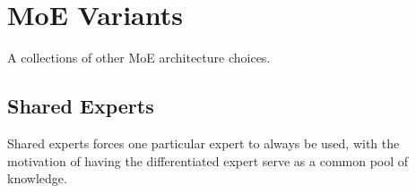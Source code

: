 \section{MoE Variants}

A collections of other MoE architecture choices.

\subsection{Shared Experts}


Shared experts forces one particular expert to always be used, with the motivation of having the
differentiated expert serve as a common pool of knowledge.
